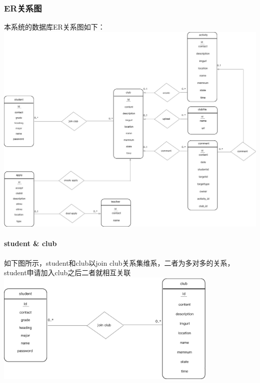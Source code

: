 \documentclass[UTF8]{ctexart}
\begin{document}
\subsubsection{ER关系图}
本系统的数据库ER关系图如下：
\newline
\includegraphics[width = 1.0\textwidth]{er.eps}
\paragraph{student \& club}
如下图所示，student和club以join club关系集维系，二者为多对多的关系，student申请加入club之后二者就相互关联 
\newline
\includegraphics[width = 0.8\textwidth]{student-club-er.eps}
\end{document}
